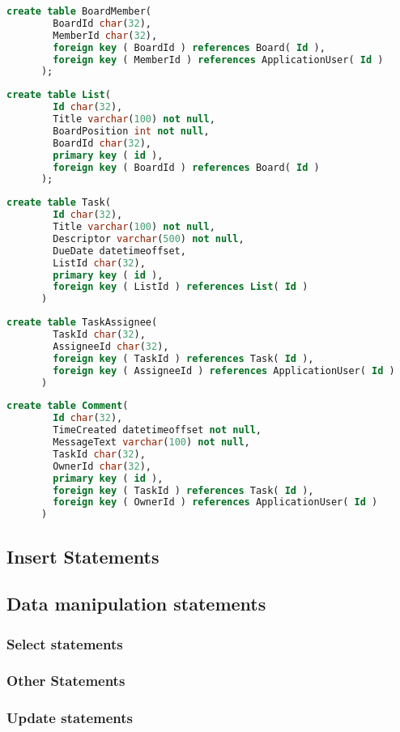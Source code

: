 \documentclass[letterpaper]{article}
\begin{document}
    \begin{lstlisting}[language=SQL, caption=BoardMember Table]
      create table BoardMember(
        BoardId char(32),
        MemberId char(32),
        foreign key ( BoardId ) references Board( Id ),
        foreign key ( MemberId ) references ApplicationUser( Id )
      );
    \end{lstlisting}
    \begin{lstlisting}[language=SQL, caption=List Table]
      create table List(
        Id char(32),
        Title varchar(100) not null,
        BoardPosition int not null,
        BoardId char(32),
        primary key ( id ),
        foreign key ( BoardId ) references Board( Id )
      );
    \end{lstlisting}
    \begin{lstlisting}[language=SQL, caption=Task Table]
      create table Task(
        Id char(32),
        Title varchar(100) not null,
        Descriptor varchar(500) not null,
        DueDate datetimeoffset,
        ListId char(32),
        primary key ( id ),
        foreign key ( ListId ) references List( Id )
      )
    \end{lstlisting}
    \begin{lstlisting}[language=SQL, caption=TaskAssignee Table]
      create table TaskAssignee(
        TaskId char(32),
        AssigneeId char(32),
        foreign key ( TaskId ) references Task( Id ),
        foreign key ( AssigneeId ) references ApplicationUser( Id )
      )
    \end{lstlisting}
    \begin{lstlisting}[language=SQL, caption=Comment Table]
      create table Comment(
        Id char(32),
        TimeCreated datetimeoffset not null,
        MessageText varchar(100) not null,
        TaskId char(32),
        OwnerId char(32),
        primary key ( id ),
        foreign key ( TaskId ) references Task( Id ),
        foreign key ( OwnerId ) references ApplicationUser( Id )
      )
    \end{lstlisting}

\subsection{Insert Statements}

\subsection{Data manipulation statements}

\subsubsection{Select statements}

\subsubsection{Other Statements}

\subsubsection{Update statements}
\end{document}
